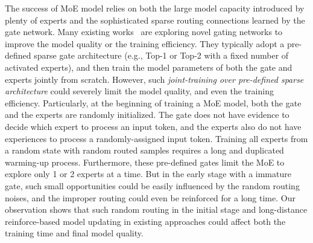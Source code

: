The success of MoE model relies on both the large model capacity introduced by plenty of experts and the sophisticated sparse routing connections learned by the gate network. 
Many existing works~\citep{DBLP:switch, DBLP:gshard, lewis2021base, roller2021hash} are exploring novel gating networks to improve the model quality or the training efficiency.
They typically adopt a pre-defined sparse gate architecture (e.g., Top-1 or Top-2 with a fixed number of activated experts), and then train the model parameters of both the gate and experts jointly from scratch.
However, such \textit{joint-training over pre-defined sparse architecture} could severely limit the model quality, and even the training efficiency.
Particularly, at the beginning of training a MoE model, both the gate and the experts are randomly initialized. The gate does not have evidence to decide which expert to process an input token, and the experts also do not have experiences to process a randomly-assigned input token. Training all experts from a random state with random routed samples requires a long and duplicated warming-up process.
Furthermore, these pre-defined gates limit the MoE to explore only 1 or 2 experts at a time. But in the early stage with a immature gate, such small opportunities could be easily  influenced by the random routing noises, and the improper routing could even be reinforced for a long time.
Our observation shows that such random routing in the initial stage and long-distance reinforce-based model updating in existing approaches could affect both the training time and final model quality.


